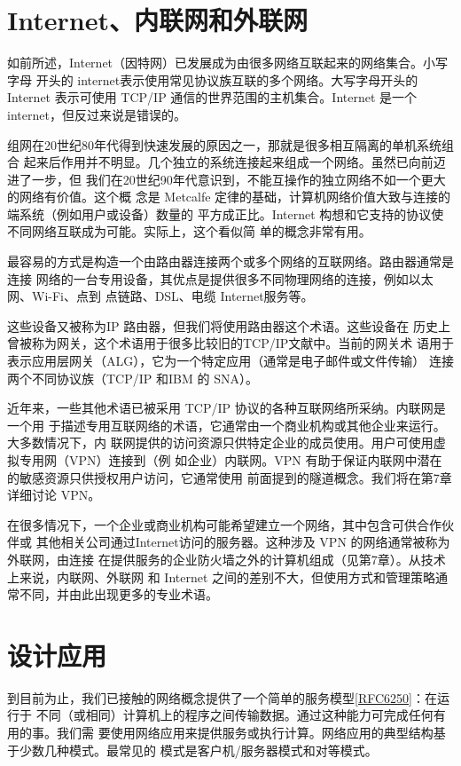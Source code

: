 \section{Internet、内联网和外联网}
如前所述，Internet（因特网）已发展成为由很多网络互联起来的网络集合。小写字母
开头的 internet表示使用常见协议族互联的多个网络。大写字母开头的 Internet 表示可使用
TCP/IP 通信的世界范围的主机集合。Internet 是一个 internet，但反过来说是错误的。

组网在20世纪80年代得到快速发展的原因之一，那就是很多相互隔离的单机系统组合
起来后作用并不明显。几个独立的系统连接起来组成一个网络。虽然已向前迈进了一步，但
我们在20世纪90年代意识到，不能互操作的独立网络不如一个更大的网络有价值。这个概
念是 Metcalfe 定律的基础，计算机网络价值大致与连接的端系统（例如用户或设备）数量的
平方成正比。Internet 构想和它支持的协议使不同网络互联成为可能。实际上，这个看似简
单的概念非常有用。

最容易的方式是构造一个由路由器连接两个或多个网络的互联网络。路由器通常是连接
网络的一台专用设备，其优点是提供很多不同物理网络的连接，例如以太网、Wi-Fi、点到
点链路、DSL、电缆 Internet服务等。

\begin{tcolorbox}
    这些设备又被称为IP 路由器，但我们将使用路由器这个术语。这些设备在
    历史上曾被称为网关，这个术语用于很多比较旧的TCP/IP文献中。当前的网关术
    语用于表示应用层网关（ALG），它为一个特定应用（通常是电子邮件或文件传输）
    连接两个不同协议族（TCP/IP 和IBM 的 SNA）。
\end{tcolorbox}
近年来，一些其他术语已被采用 TCP/IP 协议的各种互联网络所采纳。内联网是一个用
于描述专用互联网络的术语，它通常由一个商业机构或其他企业来运行。大多数情况下，内
联网提供的访问资源只供特定企业的成员使用。用户可使用虚拟专用网（VPN）连接到（例
如企业）内联网。VPN 有助于保证内联网中潜在的敏感资源只供授权用户访问，它通常使用
前面提到的隧道概念。我们将在第7章详细讨论 VPN。

在很多情况下，一个企业或商业机构可能希望建立一个网络，其中包含可供合作伙伴或
其他相关公司通过Internet访问的服务器。这种涉及 VPN 的网络通常被称为外联网，由连接
在提供服务的企业防火墙之外的计算机组成（见第7章）。从技术上来说，内联网、外联网
和 Internet 之间的差别不大，但使用方式和管理策略通常不同，并由此出现更多的专业术语。

\section{设计应用}
到目前为止，我们已接触的网络概念提供了一个简单的服务模型\href{https://www.rfc-editor.org/rfc/rfc6250}{[RFC6250]}：在运行于
不同（或相同）计算机上的程序之间传输数据。通过这种能力可完成任何有用的事。我们需
要使用网络应用来提供服务或执行计算。网络应用的典型结构基于少数几种模式。最常见的
模式是客户机/服务器模式和对等模式。

